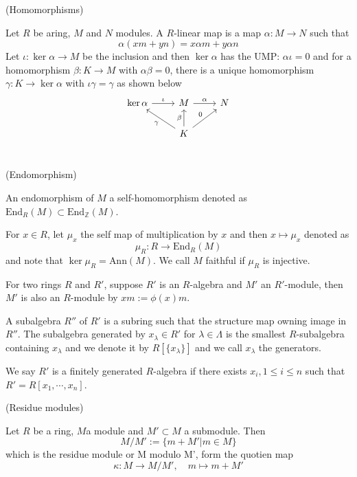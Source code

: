\documentclass{article}
\begin{document}
\begin{definition}
    (Homomorphisms)\par
    Let $R$ be aring, $M$ and $N$ modules. A $R$-linear map is a map $\alpha:M\to N$ such that
    \[
    \alpha(xm+yn) = x\alpha m + y\alpha n
    \]
    Let $\iota:\ker\alpha \to M$ be the inclusion and then $\ker\alpha$ has the UMP: $\alpha\iota = 0$ and for a homomorphism $\beta:K\to M$ with $\alpha\beta = 0$, there is a unique homomorphism $\gamma:K\to \ker\alpha$ with $\iota\gamma = \gamma$ as shown below
    \[
    \begin{tikzcd}
        \ker\alpha\arrow[r,"\iota"] & M\arrow[r,"\alpha"] & N \\
        &K\arrow[lu,"\gamma"]\arrow[u,"\beta"]\arrow[ru,"0"]& \\
    \end{tikzcd}
    \]
\end{definition}

\begin{definition}
    (Endomorphism)\par
    An endomorphism of $M$ a self-homomorphism denoted as $\text{End}_R(M) \subset \text{End}_{\mathbb{Z}}(M)$.\par
    For $x\in R$, let $\mu_x$ the self map of multiplication by $x$ and then $x\mapsto \mu_x$ denoted as
    \[\mu_R:R\to \text{End}_R(M)\]
    and note that $\ker\mu_R = \text{Ann}(M)$.
    We call $M$ faithful if $\mu_R$ is injective.
\end{definition}

\begin{definition}
    For two rings $R$ and $R'$, suppose $R'$ is an $R$-algebra and $M'$ an $R'$-module, then $M'$ is also an $R$-module by $xm:= \phi(x)m$.\par
    A subalgebra $R''$ of $R'$ is a subring such that the structure map owning image in $R''$. The subalgebra generated by $x_{\lambda} \in R'$ for $\lambda \in \Lambda$ is the smallest $R$-subalgebra containing $x_{\lambda}$ and we denote it by $R[\{x_{\lambda}\}]$ and we call $x_{\lambda}$ the generators.\par
    We say $R'$ is a finitely generated $R$-algebra if there exists $x_i, 1\leq i \leq n$ such that $R' = R[x_1,\cdots,x_n]$.
\end{definition}

\begin{definition}
    (Residue modules)\par
    Let $R$ be a ring, $M $a module and $M'\subset M$ a submodule. Then
    \[
    M/M':=\{m+M'|m\in M\}
    \]
    which is the residue module or M modulo M', form the quotien map
    \[\kappa:M\to M/M',\quad m\mapsto m+M'\]
\end{definition}
\end{document}
